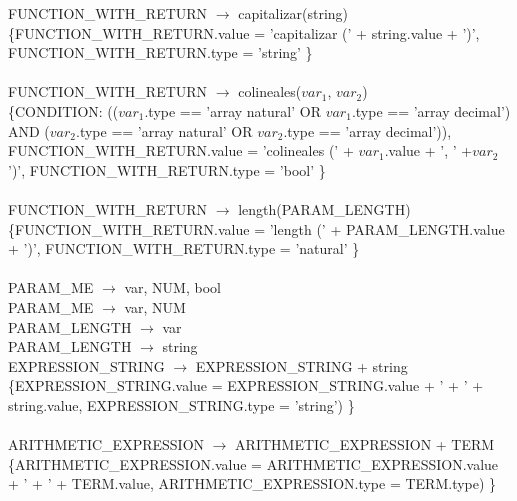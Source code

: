 \documentclass[10pt,a4paper]{article}
\begin{document}
{{{FUNCTION\_WITH\_RETURN $\rightarrow$ capitalizar(string)   \\

\{FUNCTION\_WITH\_RETURN.value =  'capitalizar (' + string.value + ')', FUNCTION\_WITH\_RETURN.type = 'string'  \}  \\ \\


FUNCTION\_WITH\_RETURN $\rightarrow$ colineales($var_{1}$, $var_{2}$)   \\

\{CONDITION: (($var_{1}$.type == 'array natural' OR $ var_{1}$.type == 'array decimal') AND
($var_{2}$.type == 'array natural' OR $var_{2}$.type == 'array decimal')), FUNCTION\_WITH\_RETURN.value =  'colineales (' + $var_{1}$.value + ', ' +$var_{2}$')', FUNCTION\_WITH\_RETURN.type = 'bool'  \}  \\ \\


FUNCTION\_WITH\_RETURN $\rightarrow$ length(PARAM\_LENGTH) \\

\{FUNCTION\_WITH\_RETURN.value =  'length (' + PARAM\_LENGTH.value + ')', FUNCTION\_WITH\_RETURN.type = 'natural'  \}  \\ \\



PARAM\_ME $\rightarrow$ var, NUM, bool   \\

PARAM\_ME $\rightarrow$ var, NUM \\

PARAM\_LENGTH $\rightarrow$ var    \\

PARAM\_LENGTH $\rightarrow$ string \\


EXPRESSION\_STRING $\rightarrow$ EXPRESSION\_STRING + string \\  

\{EXPRESSION\_STRING.value =  EXPRESSION\_STRING.value + ' + ' + string.value, EXPRESSION\_STRING.type = 'string') \}  \\ \\


ARITHMETIC\_EXPRESSION $\rightarrow$ ARITHMETIC\_EXPRESSION + TERM   \\

\{ARITHMETIC\_EXPRESSION.value =  ARITHMETIC\_EXPRESSION.value + ' + ' + TERM.value, ARITHMETIC\_EXPRESSION.type = TERM.type) \}  \\ \\


}}}
\end{document}
